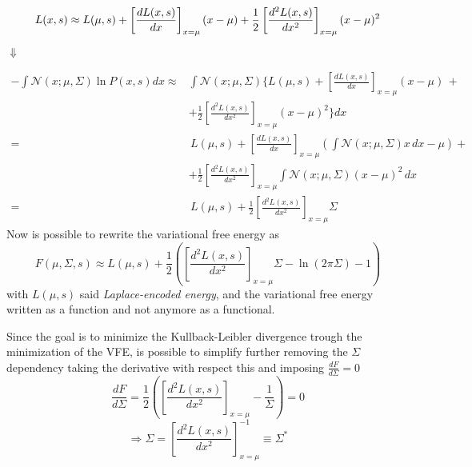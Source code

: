 \documentclass[a4paper, 10pt]{article}
\begin{document}
\begin{equation}
L(x,s) \approx L(\mu,s) + \left[ \frac{dL(x,s)}{dx} \right]_{x=\mu} (x-\mu) + \frac{1}{2} \left[ \frac{d^2L(x,s)}{dx^2} \right]_{x=\mu} (x-\mu)^2 \\
\end{equation}
\begin{center}
$\Downarrow$
\end{center}
\begin{equation}
\begin{split}
- \int \mathcal{N}(x;\mu,\Sigma) \ln P(x,s) d x \approx & \int \mathcal{N}(x;\mu,\Sigma) \Big\lbrace L(\mu,s) + \left[ \frac{dL(x,s)}{dx} \right]_{x=\mu} (x-\mu) \, + \\
													  & + \frac{1}{2} \left[ \frac{d^2L(x,s)}{dx^2} \right]_{x=\mu} (x-\mu)^2 \Big\rbrace d x \\
											  		= & \, L(\mu,s) + \left[ \frac{dL(x,s)}{dx} \right]_{x=\mu} \left( \int \mathcal{N}(x;\mu,\Sigma) x \, dx - \mu \right) + \\
											  		& + \frac{1}{2} \left[ \frac{d^2L(x,s)}{dx^2} \right]_{x=\mu} \int \mathcal{N}(x;\mu,\Sigma) (x-\mu)^2 \, dx\\
											  		= & \, L(\mu,s) + \frac{1}{2} \left[ \frac{d^2L(x,s)}{dx^2} \right]_{x=\mu} \Sigma
\end{split}
\end{equation}
Now is possible to rewrite the variational free energy as
\begin{equation}
F(\mu, \Sigma, s) \approx L(\mu, s) + \frac{1}{2}\left( \left[ \frac{d^2L(x,s)}{dx^2} \right]_{x=\mu} \Sigma - \ln (2 \pi \Sigma) -1 \right)
\end{equation}
with $L(\mu, s)$ said \emph{Laplace-encoded energy}, and the variational free energy written as a function and not anymore as a functional.

Since the goal is to minimize the Kullback-Leibler divergence trough the minimization of the VFE, is possible to simplify further removing the $\Sigma$ dependency taking the derivative with respect this and imposing $\frac{dF}{d\Sigma}=0$
\begin{equation}
\frac{dF}{d\Sigma}= \frac{1}{2} \left( \left[ \frac{d^2L(x,s)}{dx^2} \right]_{x=\mu} - \frac{1}{\Sigma} \right) = 0
\end{equation}
\begin{equation}
\Rightarrow \Sigma = \left[ \frac{d^2L(x,s)}{dx^2} \right]_{x=\mu}^{-1} \equiv \Sigma^{\ast}
\end{equation}
\end{document}
